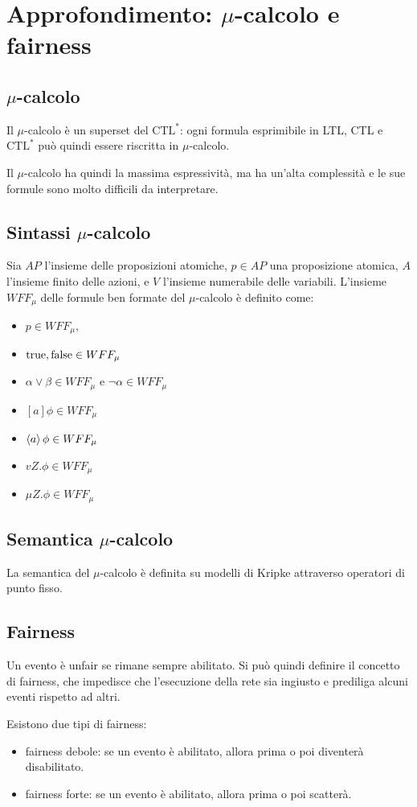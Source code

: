 \section{Approfondimento: $\mu$-calcolo e fairness}
\subsection*{$\mu$-calcolo}
Il $\mu$-calcolo è un superset del $\text{CTL}^*$: ogni formula esprimibile
in LTL, CTL e $\text{CTL}^*$ può quindi essere riscritta in $\mu$-calcolo.

Il $\mu$-calcolo ha quindi la massima espressività, ma ha un'alta complessità
e le sue formule sono molto difficili da interpretare.

\subsection*{Sintassi $\mu$-calcolo}
Sia $AP$ l'insieme delle proposizioni atomiche, $p \in AP$ una proposizione
atomica, $A$ l'insieme finito delle azioni, e $V$ l'insieme
numerabile delle variabili.
L'insieme $WFF_{\mu}$ delle formule ben formate del $\mu$-calcolo è definito come:
\begin{itemize}
    \item $p \in WFF_{\mu}$,
    \item $\textnormal{true}, \textnormal{false} \in WFF_{\mu}$
    \item $\alpha \lor \beta \in WFF_{\mu}$ e $\lnot \alpha \in WFF_{\mu}$
    \item $[a]\phi \in WFF_{\mu}$
    \item $\left\langle a\right\rangle\phi \in WFF_{\mu}$
    \item $v Z . \phi \in WFF_{\mu}$
    \item $\mu Z . \phi \in WFF_{\mu}$
\end{itemize}


\subsection*{Semantica $\mu$-calcolo}
La semantica del $\mu$-calcolo è definita su modelli di Kripke attraverso
operatori di punto fisso.

\subsection*{Fairness}
Un evento è unfair se rimane sempre abilitato.
Si può quindi definire il concetto di fairness, che impedisce che
l'esecuzione della rete sia ingiusto e prediliga alcuni eventi rispetto
ad altri.

Esistono due tipi di fairness:
\begin{itemize}
    \item fairness debole: se un evento è abilitato, allora prima o poi
    diventerà disabilitato.
    \item fairness forte: se un evento è abilitato, allora prima o poi
    scatterà.
\end{itemize}
